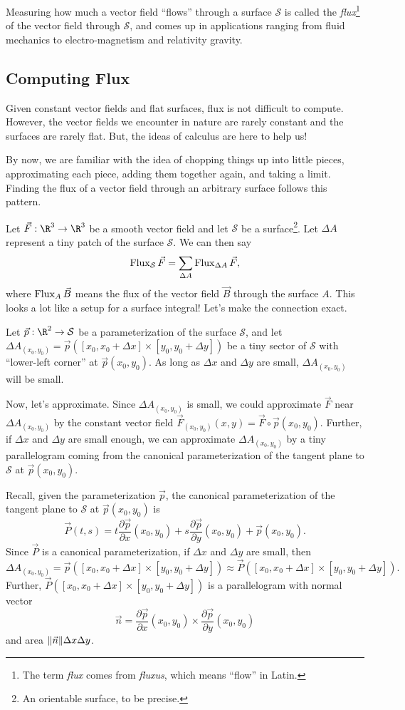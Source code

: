 Measuring how much a vector field ``flows'' through a surface $\mathcal S$
is called the \emph{flux}\footnote{
The term \emph{flux} comes from \emph{fluxus},
which means ``flow'' in Latin.
} of the vector field through $\mathcal S$, and comes up in applications
ranging from fluid mechanics to electro-magnetism and relativity gravity.

\subsection{Computing Flux}

Given constant vector fields and flat surfaces, flux is not difficult to compute.
However, the vector fields we encounter in nature are rarely constant and
the surfaces are rarely flat.  But, the ideas of calculus are here
to help us!

By now, we are familiar with the idea of chopping things up into little pieces,
approximating each piece, adding them together again, and taking a limit.  Finding
the flux of a vector field through an arbitrary surface follows this pattern.

Let $\vec F:\R^3\to\R^3$ be a smooth vector field and let $\mathcal S$ be 
a surface\footnote{ An orientable surface, to be precise.}.
Let $\Delta A$ represent a tiny patch of the surface $\mathcal S$.  We can then say
\[
	\operatorname{Flux}_{\mathcal S} \vec F = \sum_{\Delta A} \operatorname{Flux}_{\Delta A} \vec F,
\]
where $\operatorname{Flux}_A \vec B$ means the flux of the vector field $\vec B$ through the
surface $A$.  This looks a lot like a setup for a surface integral!  Let's make
the connection exact.

Let $\vec p:\R^2\to\mathcal S$ be a parameterization of the surface $\mathcal S$,
and let $\Delta A_{(x_0,y_0)}=\vec p([x_0,x_0+\Delta x]\times [y_0,y_0+\Delta y])$
be a tiny sector of $\mathcal S$ with ``lower-left corner'' at $\vec p(x_0,y_0)$.
As long as $\Delta x$ and $\Delta y$ are small, $\Delta A_{(x_0,y_0)}$ will be
small.

Now, let's approximate.  Since $\Delta A_{(x_0,y_0)}$
is small, we could approximate $\vec F$ near $\Delta A_{(x_0,y_0)}$
by the constant vector 
field $\vec F_{(x_0,y_0)}(x,y) = \vec F\circ \vec p(x_0,y_0)$.  Further,
if $\Delta x$ and $\Delta y$ are small enough, we can approximate $\Delta A_{(x_0,y_0)}$
by a tiny parallelogram coming from the 
canonical parameterization of the tangent plane to $\mathcal S$ at $\vec p(x_0,y_0)$.

Recall, given the parameterization $\vec p$,
the canonical parameterization of the tangent plane to $\mathcal S$ at $\vec p(x_0,y_0)$
is
\[
	\vec P(t,s) = t \frac{\partial \vec p}{\partial x}(x_0,y_0) + 
	s\frac{\partial \vec p}{\partial y}(x_0,y_0)
	+\vec p(x_0,y_0).
\]
Since $\vec P$ is a canonical parameterization, if $\Delta x$ and $\Delta y$
are small, then 
\[
\Delta A_{(x_0,y_0)}=\vec p([x_0,x_0+\Delta x]\times [y_0,y_0+\Delta y])
\approx \vec P([x_0,x_0+\Delta x]\times [y_0,y_0+\Delta y]).
\]
Further, $\vec P([x_0,x_0+\Delta x]\times [y_0,y_0+\Delta y])$ is a parallelogram
with normal vector
\[
	\vec n = \frac{\partial \vec p}{\partial x}(x_0,y_0) \times
	\frac{\partial \vec p}{\partial y}(x_0,y_0)
\]
and area $\lVert\vec n\rVert\Delta x\Delta y$.

